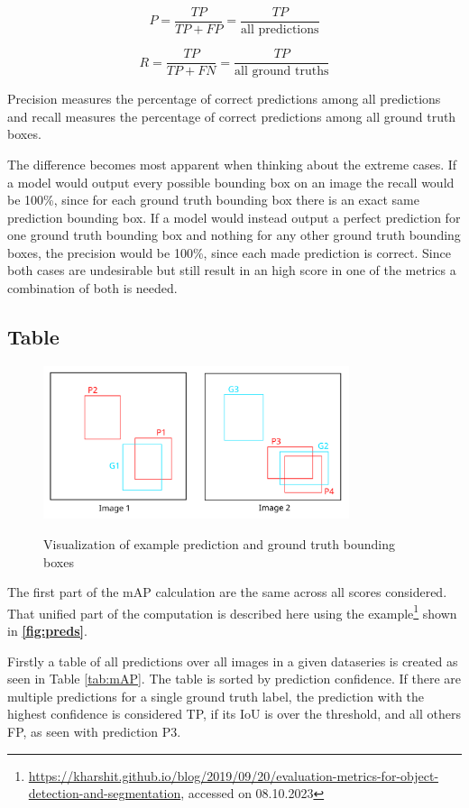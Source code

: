 \documentclass[10pt]{book}
\newcommand{\figureref}[1]{\textbf{\autoref{#1}}}
\begin{document}
$$P = \frac{TP}{TP + FP} = \frac{TP}{\text{all predictions}}$$

$$R = \frac{TP}{TP + FN} = \frac{TP}{\text{all ground truths}}$$

Precision measures the percentage of correct predictions among all predictions and recall measures the percentage of correct predictions among all ground truth boxes. 

The difference becomes most apparent when thinking about the extreme cases. If a model would output every possible bounding box on an image the recall would be 100\%, since for each ground truth bounding box there is an exact same prediction bounding box. If a model would instead output a perfect prediction for one ground truth bounding box and nothing for any other ground truth bounding boxes, the precision would be 100\%, since each made prediction is correct. Since both cases are undesirable but still result in an high score in one of the metrics a combination of both is needed.

\subsection{Table}

\begin{figure}
  \caption{Visualization of example prediction and ground truth bounding boxes}
  \includegraphics[width=0.8\textwidth]{image/preds}
  \label{fig:preds}
\end{figure}

The first part of the \ac{mAP} calculation are the same across all scores considered. That unified part of the computation is described here using the example\footnote{\url{https://kharshit.github.io/blog/2019/09/20/evaluation-metrics-for-object-detection-and-segmentation}, accessed on 08.10.2023} shown in \figureref{fig:preds}. 

Firstly a table of all predictions over all images in a given dataseries is created as seen in Table \ref{tab:mAP}. The table is sorted by prediction confidence. If there are multiple predictions for a single ground truth label, the prediction with the highest confidence is considered TP, if its \ac{IoU} is over the threshold, and all others FP, as seen with prediction P3. 
\end{document}
